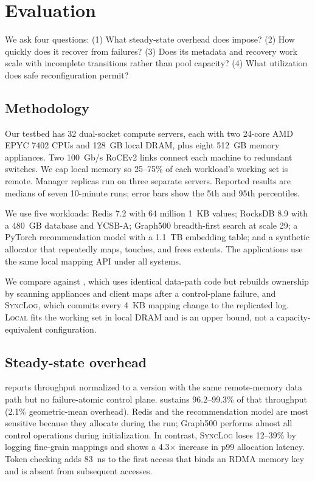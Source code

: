 \section{Evaluation}
\label{sec:evaluation}

We ask four questions: (1) What steady-state overhead does \system impose?
(2) How quickly does it recover from failures? (3) Does its metadata and
recovery work scale with incomplete transitions rather than pool capacity?
(4) What utilization does safe reconfiguration permit?

\subsection{Methodology}

Our testbed has 32 dual-socket compute servers, each with two 24-core AMD EPYC
7402 CPUs and 128~GB local DRAM, plus eight 512~GB memory appliances. Two
100~Gb/s RoCEv2 links connect each machine to redundant switches. We cap local
memory so 25--75\% of each workload's working set is remote. Manager replicas
run on three separate servers. Reported results are medians of seven 10-minute
runs; error bars show the 5th and 95th percentiles.

We use five workloads: Redis 7.2 with 64 million 1~KB values; RocksDB 8.9 with a
480~GB database and YCSB-A; Graph500 breadth-first search at scale 29; a
PyTorch recommendation model with a 1.1~TB embedding table; and a synthetic
allocator that repeatedly maps, touches, and frees extents. The applications
use the same local mapping API under all systems.

We compare against \baseline, which uses identical data-path code but rebuilds
ownership by scanning appliances and client maps after a control-plane failure,
and \textsc{SyncLog}, which commits every 4~KB mapping change to the replicated
log. \textsc{Local} fits the working set in local DRAM and is an upper bound,
not a capacity-equivalent configuration.

\subsection{Steady-state overhead}

 reports throughput normalized to a version with the same
remote-memory data path but no failure-atomic control plane. \system sustains
96.2--99.3\% of that throughput (2.1\% geometric-mean overhead). Redis and the
recommendation model are most sensitive because they allocate during the run;
Graph500 performs almost all control operations during initialization. In
contrast, \textsc{SyncLog} loses 12--39\% by logging fine-grain mappings and
shows a 4.3$\times$ increase in p99 allocation latency. Token checking adds
83~ns to the first access that binds an RDMA memory key and is absent from
subsequent accesses.

